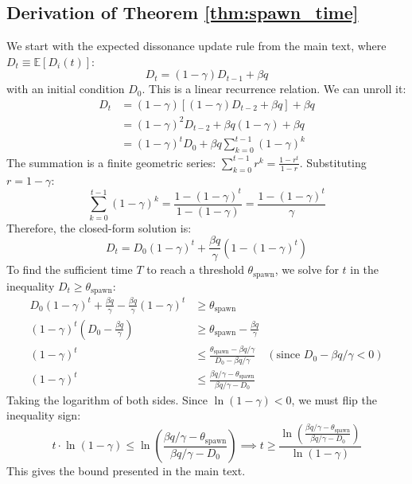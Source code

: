 \documentclass{article}
\begin{document}



\newpage
\begin{appendices}

\section{Derivation of Theorem \ref{thm:spawn_time}}
We start with the expected dissonance update rule from the main text, where $D_t \equiv \mathbb{E}[D_i(t)]$:
\begin{equation}
D_t = (1-\gamma)D_{t-1} + \beta q
\end{equation}
with an initial condition $D_0$. This is a linear recurrence relation. We can unroll it:
\begin{align*}
D_t &= (1-\gamma) \left[ (1-\gamma)D_{t-2} + \beta q \right] + \beta q \\
    &= (1-\gamma)^2 D_{t-2} + \beta q (1-\gamma) + \beta q \\
    &= (1-\gamma)^t D_0 + \beta q \sum_{k=0}^{t-1} (1-\gamma)^k
\end{align*}
The summation is a finite geometric series: $\sum_{k=0}^{t-1} r^k = \frac{1-r^t}{1-r}$. Substituting $r = 1-\gamma$:
\begin{equation}
\sum_{k=0}^{t-1} (1-\gamma)^k = \frac{1 - (1-\gamma)^t}{1 - (1-\gamma)} = \frac{1 - (1-\gamma)^t}{\gamma}
\end{equation}
Therefore, the closed-form solution is:
\begin{equation}
D_t = D_0(1-\gamma)^t + \frac{\beta q}{\gamma} \left(1-(1-\gamma)^t\right)
\end{equation}
To find the sufficient time $T$ to reach a threshold $\theta_{\text{spawn}}$, we solve for $t$ in the inequality $D_t \ge \theta_{\text{spawn}}$:
\begin{align*}
D_0(1-\gamma)^t + \frac{\beta q}{\gamma} - \frac{\beta q}{\gamma}(1-\gamma)^t &\ge \theta_{\text{spawn}} \\
(1-\gamma)^t \left(D_0 - \frac{\beta q}{\gamma}\right) &\ge \theta_{\text{spawn}} - \frac{\beta q}{\gamma} \\
(1-\gamma)^t &\le \frac{\theta_{\text{spawn}} - \beta q/\gamma}{D_0 - \beta q/\gamma} \quad (\text{since } D_0 - \beta q/\gamma < 0) \\
(1-\gamma)^t &\le \frac{\beta q/\gamma - \theta_{\text{spawn}}}{\beta q/\gamma - D_0}
\end{align*}
Taking the logarithm of both sides. Since $\ln(1-\gamma) < 0$, we must flip the inequality sign:
\begin{equation*}
t \cdot \ln(1-\gamma) \le \ln\left(\frac{\beta q/\gamma - \theta_{\text{spawn}}}{\beta q/\gamma - D_0}\right) \implies t \ge \frac{\ln\left(\frac{\beta q/\gamma - \theta_{\text{spawn}}}{\beta q/\gamma - D_0}\right)}{\ln(1-\gamma)}
\end{equation*}
This gives the bound presented in the main text.

\end{appendices}
\end{document}
